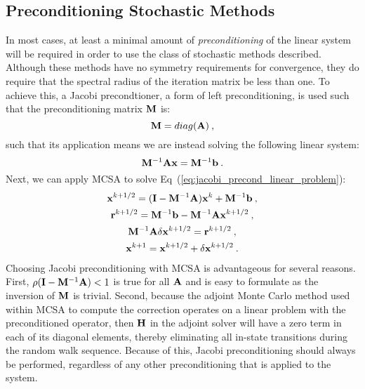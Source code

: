 \subsection{Preconditioning Stochastic Methods}
\label{subsubsec:stochastic_preconditioning}
In most cases, at least a minimal amount of \textit{preconditioning}
of the linear system will be required in order to use the class of
stochastic methods described. Although these methods have no symmetry
requirements for convergence, they do require that the spectral radius
of the iteration matrix be less than one. To achieve this, a Jacobi
precondtioner, a form of left preconditioning, is used such that the
preconditioning matrix $\mathbf{M}$ is:
\begin{equation}
  \mathbf{M} = diag(\mathbf{A})\:,
  \label{eq:jacobi_preconditioner}
\end{equation}
such that its application means we are instead solving the following
linear system:
\begin{equation}
  \mathbf{M}^{-1}\mathbf{A}\mathbf{x} = \mathbf{M}^{-1}\mathbf{b}\:.
  \label{eq:jacobi_precond_linear_problem}
\end{equation}
Next, we can apply MCSA to solve
Eq~(\ref{eq:jacobi_precond_linear_problem}): 
\begin{subequations}
  \begin{gather}
    \mathbf{x}^{k+1/2} = (\mathbf{I} - \mathbf{M}^{-1}\mathbf{A})\mathbf{x}^k +
    \mathbf{M}^{-1}\mathbf{b}\:,\\ \mathbf{r}^{k+1/2} = \mathbf{M}^{-1}\mathbf{b} -
    \mathbf{M}^{-1}\mathbf{A}\mathbf{x}^{k+1/2}\:,\\ \mathbf{M}^{-1}\mathbf{A}\delta\mathbf{x}^{k+1/2}
    = \mathbf{r}^{k+1/2}\:,\\ \mathbf{x}^{k+1} = \mathbf{x}^{k+1/2} + \delta
    \mathbf{x}^{k+1/2}\:.
    \label{eq:jacobi_preconditioned_mcsa}
  \end{gather}
\end{subequations}
Choosing Jacobi preconditioning with MCSA is advantageous for several
reasons. First, $\rho(\mathbf{I} - \mathbf{M}^{-1}\mathbf{A}) < 1$ is true for
all $\mathbf{A}$ and is easy to formulate as the inversion of $\mathbf{M}$ is
trivial. Second, because the adjoint Monte Carlo method used within MCSA to
compute the correction operates on a linear problem with the
preconditioned operator, then $\mathbf{H}$ in the adjoint solver will have
a zero term in each of its diagonal elements, thereby eliminating
all in-state transitions during the random walk sequence. Because of
this, Jacobi preconditioning should always be performed, regardless of
any other preconditioning that is applied to the system.

